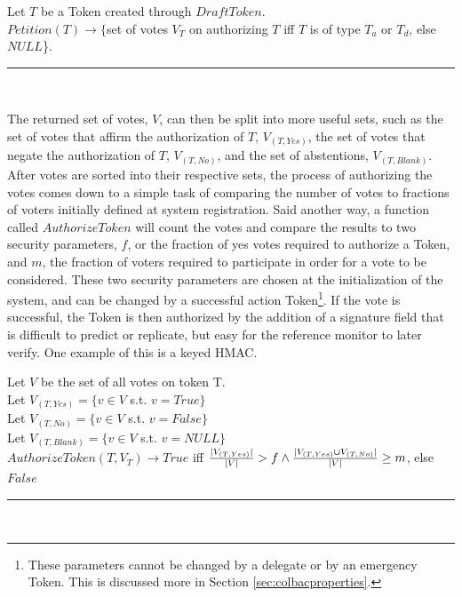 \begin{definition}\label{def:petition}
Let $T$ be a Token created through $DraftToken$.\\
$Petition(T) \rightarrow \{$set of votes $V_{T}$ on authorizing $T$ iff $T$ is
of type $T_{a}$ or $T_{d}$, else $NULL$\}.\\
\hrule \mbox{}\\
\end{definition}

\noindent The returned set of votes, $V$, can then be split into more useful
sets, such as the set of votes that affirm the authorization of $T$,
$V_{(T, Yes)}$, the set of votes that negate the authorization of $T$,
$V_{(T, No)}$, and the set of abstentions, $V_{(T, Blank)}$. After votes are
sorted into their respective sets, the process of authorizing the votes comes
down to a simple task of comparing the number of votes to fractions of voters
initially defined at system registration. Said another way, a function called
$AuthorizeToken$ will count the votes and compare the results to two security
parameters, $f$, or the fraction of yes votes required to authorize a Token, and
$m$, the fraction of voters required to participate in order for a vote to be
considered. These two security parameters are chosen at the initialization of
the system, and can be changed by a successful action Token\footnote{These
parameters cannot be changed by a delegate or by an emergency Token. This is
discussed more in Section \ref{sec:colbacproperties}.}. If the vote is
successful, the Token is then authorized by the addition of a signature field
that is difficult to predict or replicate, but easy for the reference monitor to
later verify. One example of this is a keyed HMAC.

\begin{definition}
Let $V$ be the set of all votes on token T.\\
Let $V_{(T, Yes)} = \{v \in V$ s.t. $v = True\}$\\
Let $V_{(T, No)} = \{v \in V$ s.t. $v = False\}$\\
Let $V_{(T, Blank)} = \{v \in V$ s.t. $v = NULL\}$\\
$AuthorizeToken(T,V_{T}) \rightarrow True$ iff $\frac{|V_{(T, Yes)}|}{|V|} > f
\wedge \\ \frac{|V_{(T,Yes)} \cup V_{(T, No)}|}{|V|} \ge m$, else $False$\\
\hrule\mbox{}\\
\end{definition}

